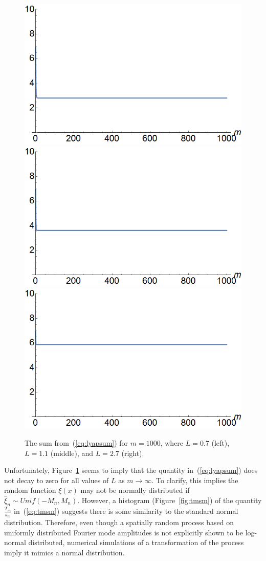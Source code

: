 \begin{figure}[!h]
\caption[The sum in the Lyapunov Central Limit Theorem]{The sum
  from~(\ref{eq:lyapsum}) for $m=1000$, where $L=0.7$ (left), $L=1.1$ (middle), and $L=2.7$ (right).}\label{fig:lyapsum}
	\begin{center}
		\includegraphics[width=.33\textwidth]{figs/lyapunov_clt_L_07.png}\hfill
\includegraphics[width=.33\textwidth]{figs/lyapunov_clt_L_11.png}\hfill
\includegraphics[width=.33\textwidth]{figs/lyapunov_clt_L_27.png}
	\end{center}
\end{figure}
Unfortunately, Figure~\ref{fig:lyapsum} seems to imply that the quantity
in~(\ref{eq:lyapsum}) does not decay to zero for all values of $L$ as
$m \to \infty$. To clarify, this implies the random function $\xi(x)$
may not be normally distributed if $\hat{\xi}_n \sim
Unif(-M_n,M_n)$. However, a histogram (Figure~\ref{fig:tmsm}) of the quantity $\frac{T_m}{s_m}$ in~(\ref{eq:tmsm})
suggests there is some similarity to the standard normal
distribution. Therefore, even though a spatially random process based
on uniformly distributed Fourier mode amplitudes is not explicitly
shown to be log-normal distributed, numerical simulations of a
transformation of the process imply it mimics a normal distribution.

